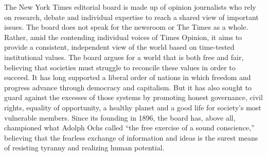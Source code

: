 The New York Times editorial board is made up of opinion journalists who
rely on research, debate and individual expertise to reach a shared view
of important issues. The board does not speak for the newsroom or The
Times as a whole. Rather, amid the contending individual voices of Times
Opinion, it aims to provide a consistent, independent view of the world
based on time-tested institutional values. The board argues for a world
that is both free and fair, believing that societies must struggle to
reconcile these values in order to succeed. It has long supported a
liberal order of nations in which freedom and progress advance through
democracy and capitalism. But it has also sought to guard against the
excesses of those systems by promoting honest governance, civil rights,
equality of opportunity, a healthy planet and a good life for society's
most vulnerable members. Since its founding in 1896, the board has,
above all, championed what Adolph Ochs called ``the free exercise of a
sound conscience,'' believing that the fearless exchange of information
and ideas is the surest means of resisting tyranny and realizing human
potential.

